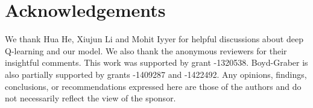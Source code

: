 \documentclass{article}
\begin{document}








\section*{Acknowledgements}
We thank Hua He, Xiujun Li and Mohit Iyyer for helpful discussions about deep Q-learning and our model. 
We also thank the anonymous reviewers for their insightful comments.
This work was supported by  grant -1320538.
Boyd-Graber is also partially supported by  grants
-1409287 and -1422492. Any opinions, findings,
conclusions, or recommendations expressed here are those of the
authors and do not necessarily reflect the view of the sponsor.




\end{document}
